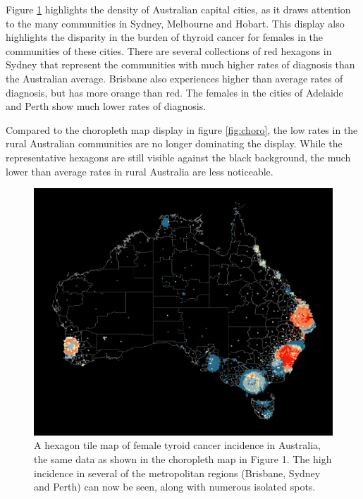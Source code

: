 Figure \ref{fig:hexmap} highlights the density of Australian capital
cities, as it draws attention to the many communities in Sydney,
Melbourne and Hobart. This display also highlights the disparity in the
burden of thyroid cancer for females in the communities of these cities.
There are several collections of red hexagons in Sydney that represent
the communities with much higher rates of diagnosis than the Australian
average. Brisbane also experiences higher than average rates of
diagnosis, but has more orange than red. The females in the cities of
Adelaide and Perth show much lower rates of diagnosis.

Compared to the choropleth map display in figure \ref{fig:choro}, the
low rates in the rural Australian communities are no longer dominating
the display. While the representative hexagons are still visible against
the black background, the much lower than average rates in rural
Australia are less noticeable.

\begin{Schunk}
\begin{figure}
\includegraphics[width=0.95\linewidth]{kobakian-cook_files/figure-latex/hexmap-1} \caption[A hexagon tile map of female tyroid cancer incidence in Australia, the same data as shown in the choropleth map in Figure 1]{A hexagon tile map of female tyroid cancer incidence in Australia, the same data as shown in the choropleth map in Figure 1. The high incidence in several of the metropolitan regions (Brisbane, Sydney and Perth) can now be seen, along with numerous isolated spots.}\label{fig:hexmap}
\end{figure}
\end{Schunk}

